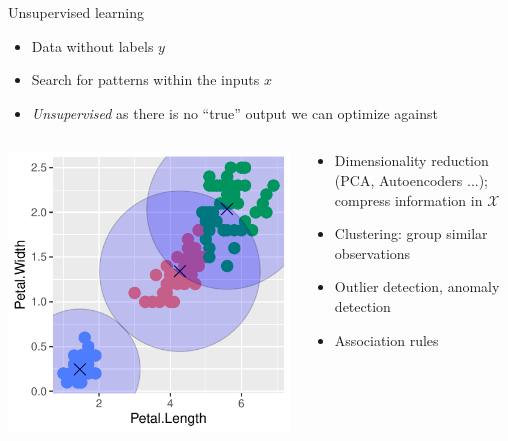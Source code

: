 \documentclass[11pt,compress,t,notes=noshow, xcolor=table]{beamer}
\begin{document}
\begin{vbframe}{Unsupervised learning}
\begin{itemize}
  \item Data without labels $y$
  \item Search for patterns within the inputs $x$
  \item \textit{Unsupervised} as there is no \enquote{true} output
      we can optimize against
\end{itemize}

\lz

\begin{columns}
\begin{column}{0.45\textwidth}
\begin{center}
    \includegraphics[width=\textwidth]{figure/unsup.pdf}
\end{center}
\end{column}
\begin{column}{0.55\textwidth}
\begin{itemize}
    \item Dimensionality reduction (PCA, Autoencoders ...);\\ 
        compress information in $\mathcal X$
    \item Clustering: group similar observations
    \item Outlier detection, anomaly detection
    \item Association rules
\end{itemize}
\end{column}
\end{columns}
\end{vbframe}
\end{document}

